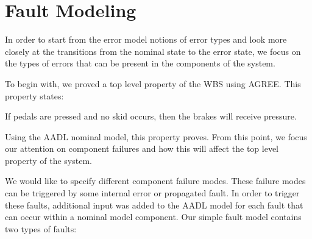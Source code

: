 \section{Fault Modeling}

In order to start from the error model notions of error types and look more closely at the transitions from the nominal state to the error state, we focus on the types of errors that can be present in the components of the system. 

To begin with, we proved a top level property of the WBS using AGREE. This property states: \\

\begin{tt}
If pedals are pressed and no skid occurs, then the brakes will receive pressure. \\
\end{tt}

Using the AADL nominal model, this property proves. From this point, we focus our attention on component failures and how this will affect the top level property of the system. 

We would like to specify different component failure modes. These failure modes can be triggered by some internal error or propagated fault. In order to trigger these faults, additional input was added to the AADL model for each fault that can occur within a nominal model component. Our simple fault model contains two types of faults:

